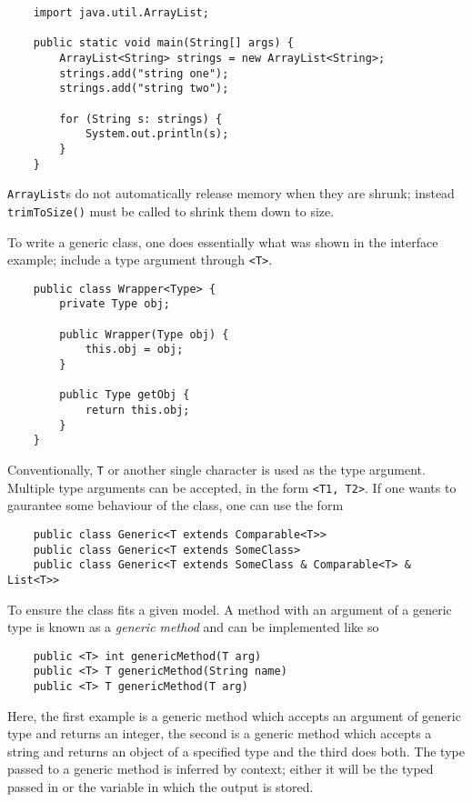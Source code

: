 \documentclass[12pt]{report}
\newcommand{\code}[1]{\lstinline{#1}}
\begin{document}
\begin{flushleft}
\begin{lstlisting}
    import java.util.ArrayList;

    public static void main(String[] args) {
        ArrayList<String> strings = new ArrayList<String>;
        strings.add("string one");
        strings.add("string two");

        for (String s: strings) {
            System.out.println(s);
        }
    }
\end{lstlisting}

\code{ArrayList}s do not automatically release memory when they are shrunk;
instead \code{trimToSize()} must be called to shrink them down to size. \par
To write a generic class, one does essentially what was shown in the interface
example; include a type argument through \code{<T>}.

\begin{lstlisting}
    public class Wrapper<Type> {
        private Type obj;

        public Wrapper(Type obj) {
            this.obj = obj;
        }

        public Type getObj {
            return this.obj;
        }
    }
\end{lstlisting}

Conventionally, \code{T} or another single character is used as the type
argument. Multiple type arguments can be accepted, in the form
\code{<T1, T2>}. If one wants to gaurantee some behaviour of the class, one can
use the form

\begin{lstlisting}
    public class Generic<T extends Comparable<T>>
    public class Generic<T extends SomeClass>
    public class Generic<T extends SomeClass & Comparable<T> & List<T>>
\end{lstlisting}

To ensure the class fits a given model. A method with an argument of a generic
type is known as a \textit{generic method} and can be implemented like so

\begin{lstlisting}
    public <T> int genericMethod(T arg)
    public <T> T genericMethod(String name)
    public <T> T genericMethod(T arg)
\end{lstlisting}

Here, the first example is a generic method which accepts an argument of
generic type and returns an integer, the second is a generic method which
accepts a string and returns an object of a specified type and the third does
both. The type passed to a generic method is inferred by context; either it
will be the typed passed in or the variable in which the output is stored.


\end{flushleft}
\end{document}
